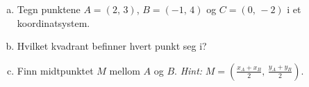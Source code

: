 %
\begin{enumerate}[a)]
    \item Tegn punktene $A = (2,\,3)$, $B = (-1,\,4)$ og $C = (0,\,-2)$ i et koordinatsystem.
    \item Hvilket kvadrant befinner hvert punkt seg i?
    \item Finn midtpunktet $M$ mellom $A$ og $B$. \textit{Hint: } $M = \left(\frac{x_A + x_B}{2},\, \frac{y_A + y_B}{2}\right)$.
\end{enumerate}
